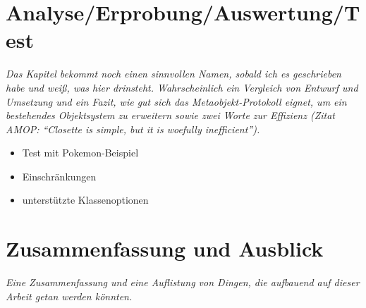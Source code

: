 \chapter{Analyse/Erprobung/Auswertung/Test}
\textit{Das Kapitel bekommt noch einen sinnvollen Namen, sobald ich es geschrieben habe und weiß, was hier drinsteht. Wahrscheinlich ein Vergleich von Entwurf und Umsetzung und ein Fazit, wie gut sich das Metaobjekt-Protokoll eignet, um ein bestehendes Objektsystem zu erweitern sowie zwei Worte zur Effizienz (Zitat AMOP: ``Closette is simple, but it is woefully inefficient'').}

\begin{itemize}
 \item Test mit Pokemon-Beispiel
 \item Einschränkungen
 \item unterstützte Klassenoptionen
\end{itemize}


\chapter{Zusammenfassung und Ausblick}
\textit{Eine Zusammenfassung und eine Auflistung von Dingen, die aufbauend auf dieser Arbeit getan werden könnten.}

\cleardoublepage
{}
{}

  
\cleardoublepage


\cleardoublepage




